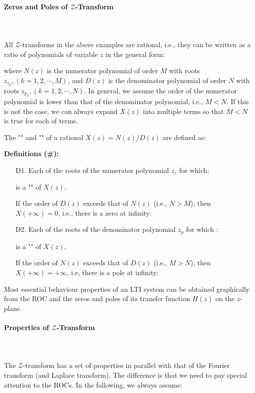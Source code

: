 	\pagebreak
	\paragraph{Zeros and Poles of $\mathcal{Z}$-Transform}\mbox{}\\\\
	All $\mathcal{Z}$-transforms in the above examples are rational, i.e., they can be written as a ratio of polynomials of variable $z$ in the general form:
	
	where $N(z)$ is the numerator polynomial of order $M$ with roots $z_{z_k}, (k=1,2, \cdots, M)$, and $D(z)$ is the denominator polynomial of order $N$ with roots $z_{p_k}, (k=1,2, \cdots, N)$. In general, we assume the order of the numerator polynomial is lower than that of the denominator polynomial, i.e.,  $M < N$. If this is not the case, we can always expand $X(z)$ into multiple terms so that $M<N$ is true for each of terms.
	
	The "" and "" of a rational $X(z)=N(z)/D(z)$ are defined as:
	
	\textbf{Definitions (\#\mydef):} 
	\begin{enumerate}
		\item[D1.]  Each of the roots of the numerator polynomial $z_z$ for which:
		
		is a "" of $X(z)$.
	
	  	If the order of $D(z)$ exceeds that of $N(z)$ (i.e., $N>M$), then $X({+\infty})=0$, i.e., there is a zero at infinity:
	  	
	
		\item[D2.] Each of the roots of the denominator polynomial $z_p$ for which :
		
		is a "" of $X(z)$.
	
		If the order of $N(z)$ exceeds that of $D(z)$ (i.e., $M>N$), then $X({+\infty})={+\infty}$, i.e, there is a pole at infinity: 
	  
	\end{enumerate}
	Most essential behaviour properties of an LTI system can be obtained graphically from the ROC and the zeros and poles of its transfer function $H(z)$ on the $z$-plane.
	
	\paragraph{Properties of $\mathcal{Z}$-Transform}\mbox{}\\\\
	The $\mathcal{Z}$-transform has a set of properties in parallel with that of the Fourier transform (and Laplace transform). The difference is that we need to pay special attention to the ROCs. In the following, we always assume:
	
